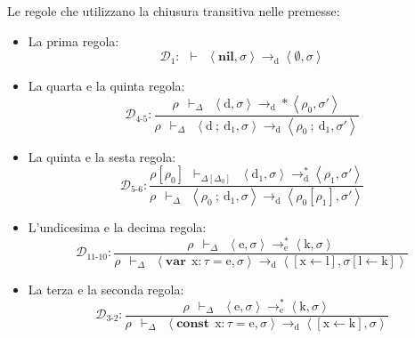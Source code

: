 \documentclass[a4paper]{article}
\begin{document}
 	Le regole che utilizzano la chiusura transitiva nelle premesse:
 	\begin{itemize}
 		\item La prima regola:
 		\begin{equation*}
 			\mathcal{D}_{1} : \:\: \vdash \:\: \left\langle \mathbf{nil}, \sigma \right\rangle \rightarrow_{\mathrm{d}} \left\langle \emptyset, \sigma \right\rangle
 		\end{equation*}
 	
 		\item La quarta e la quinta regola:
 		\begin{equation*}
 			\mathcal{D}_{4\text{-}5} : \dfrac{
 				\rho \:\: \vdash_{\Delta} \:\: \left\langle \mathrm{d}, \sigma \right\rangle \rightarrow_{\mathrm{d}}* \left\langle \rho_{0}, \sigma' \right\rangle
 			}{
 				\rho \:\: \vdash_{\Delta} \:\: \left\langle \mathrm{d} \: \mathbf{;} \: \mathrm{d}_{1}, \sigma \right\rangle \rightarrow_{\mathrm{d}} \left\langle \rho_{0} \: \mathbf{;} \: \mathrm{d}_{1}, \sigma' \right\rangle
 			}
 		\end{equation*}
 	
 		\item La quinta e la sesta regola:
 		\begin{equation*}
 			\mathcal{D}_{5\text{-}6} : \dfrac{
 				\rho\left[\rho_{0}\right] \:\: \vdash_{\Delta\left[\Delta_{0}\right]} \:\: \left\langle \mathrm{d}_{1}, \sigma \right\rangle \rightarrow_{\mathrm{d}}^{*} \left\langle \rho_{1}, \sigma' \right\rangle
 			}{
 				\rho \:\: \vdash_{\Delta} \:\: \left\langle \rho_{0} \: \mathbf{;} \: \mathrm{d}_{1}, \sigma \right\rangle \rightarrow_{\mathrm{d}} \left\langle \rho_{0}\left[\rho_{1}\right], \sigma' \right\rangle
 			}
 		\end{equation*}
 		
 		\item L'undicesima e la decima regola:
 		\begin{equation*}
 			\mathcal{D}_{11\text{-}10} : \dfrac{
 				\rho \:\: \vdash_{\Delta} \:\: \left\langle \mathrm{e}, \sigma \right\rangle \rightarrow_{\mathrm{e}}^{*} \left\langle \mathrm{k}, \sigma \right\rangle
 			}{
 				\rho \:\: \vdash_{\Delta} \:\: \left\langle \mathbf{var} \:\: \mathrm{x}:\tau = \mathrm{e}, \sigma \right\rangle \rightarrow_{\mathrm{d}} \left\langle \left[\mathrm{x} \leftarrow \mathrm{l}\right], \sigma\left[\mathrm{l} \leftarrow \mathrm{k}\right] \right\rangle
 			}
 		\end{equation*}
 	
 		\item La terza e la seconda regola:
 		\begin{equation*}
 			\mathcal{D}_{3\text{-}2} : \dfrac{
 				\rho \:\: \vdash_{\Delta} \:\: \left\langle \mathrm{e}, \sigma \right\rangle \rightarrow_{\mathrm{e}}^{*} \left\langle \mathrm{k}, \sigma \right\rangle
 			}{
 				\rho \:\: \vdash_{\Delta} \:\: \left\langle \mathbf{const} \:\: \mathrm{x}:\tau = \mathrm{e}, \sigma \right\rangle \rightarrow_{\mathrm{d}} \left\langle \left[\mathrm{x} \leftarrow \mathrm{k}\right], \sigma \right\rangle
 			}
 		\end{equation*}
 	

\end{itemize}
\end{document}

